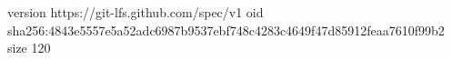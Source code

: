 version https://git-lfs.github.com/spec/v1
oid sha256:4843e5557e5a52adc6987b9537ebf748c4283c4649f47d85912feaa7610f99b2
size 120
